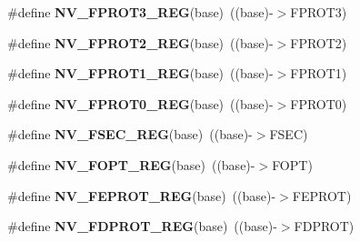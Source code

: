 \begin{DoxyCompactItemize}
\item 
\#define {\bfseries N\+V\+\_\+\+F\+P\+R\+O\+T3\+\_\+\+R\+EG}(base)~((base)-\/$>$F\+P\+R\+O\+T3)\hypertarget{group__NV__Register__Accessor__Macros_ga7ef7bb75074b8db9da605af5ca216f74}{}\label{group__NV__Register__Accessor__Macros_ga7ef7bb75074b8db9da605af5ca216f74}

\item 
\#define {\bfseries N\+V\+\_\+\+F\+P\+R\+O\+T2\+\_\+\+R\+EG}(base)~((base)-\/$>$F\+P\+R\+O\+T2)\hypertarget{group__NV__Register__Accessor__Macros_gabac2653345915e29796a13ba870336c3}{}\label{group__NV__Register__Accessor__Macros_gabac2653345915e29796a13ba870336c3}

\item 
\#define {\bfseries N\+V\+\_\+\+F\+P\+R\+O\+T1\+\_\+\+R\+EG}(base)~((base)-\/$>$F\+P\+R\+O\+T1)\hypertarget{group__NV__Register__Accessor__Macros_ga2cb779bd7985368b49343a7a4227a4c2}{}\label{group__NV__Register__Accessor__Macros_ga2cb779bd7985368b49343a7a4227a4c2}

\item 
\#define {\bfseries N\+V\+\_\+\+F\+P\+R\+O\+T0\+\_\+\+R\+EG}(base)~((base)-\/$>$F\+P\+R\+O\+T0)\hypertarget{group__NV__Register__Accessor__Macros_ga7142989d8224cb5f1b5e466c72363e3a}{}\label{group__NV__Register__Accessor__Macros_ga7142989d8224cb5f1b5e466c72363e3a}

\item 
\#define {\bfseries N\+V\+\_\+\+F\+S\+E\+C\+\_\+\+R\+EG}(base)~((base)-\/$>$F\+S\+EC)\hypertarget{group__NV__Register__Accessor__Macros_ga67787d311ca4c58b135b4427b0431dca}{}\label{group__NV__Register__Accessor__Macros_ga67787d311ca4c58b135b4427b0431dca}

\item 
\#define {\bfseries N\+V\+\_\+\+F\+O\+P\+T\+\_\+\+R\+EG}(base)~((base)-\/$>$F\+O\+PT)\hypertarget{group__NV__Register__Accessor__Macros_ga0fd99fc3ae6d1b27bb5e0448f6c90761}{}\label{group__NV__Register__Accessor__Macros_ga0fd99fc3ae6d1b27bb5e0448f6c90761}

\item 
\#define {\bfseries N\+V\+\_\+\+F\+E\+P\+R\+O\+T\+\_\+\+R\+EG}(base)~((base)-\/$>$F\+E\+P\+R\+OT)\hypertarget{group__NV__Register__Accessor__Macros_ga319d4f25f7663ace859675ef212c8f7a}{}\label{group__NV__Register__Accessor__Macros_ga319d4f25f7663ace859675ef212c8f7a}

\item 
\#define {\bfseries N\+V\+\_\+\+F\+D\+P\+R\+O\+T\+\_\+\+R\+EG}(base)~((base)-\/$>$F\+D\+P\+R\+OT)\hypertarget{group__NV__Register__Accessor__Macros_gae4db2d75ac590f7ccad06bdc0f41adac}{}\label{group__NV__Register__Accessor__Macros_gae4db2d75ac590f7ccad06bdc0f41adac}


\end{DoxyCompactItemize}
